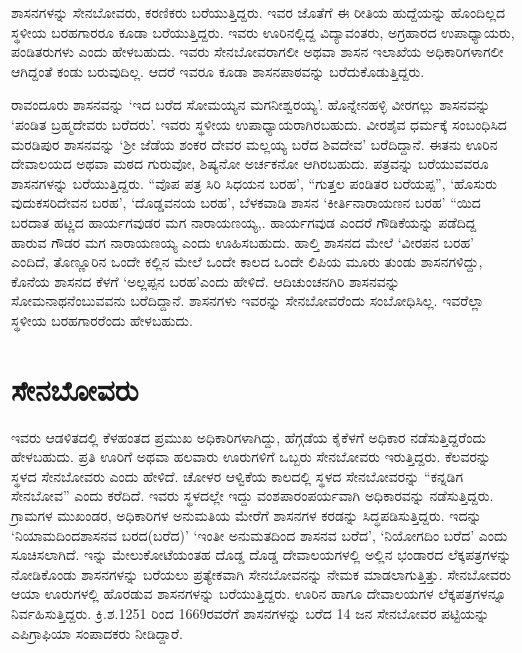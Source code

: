 ಶಾಸನಗಳನ್ನು ಸೇನಬೋವರು, ಕರಣಿಕರು ಬರೆಯುತ್ತಿದ್ದರು. ಇವರ ಜೊತೆಗೆ ಈ ರೀತಿಯ ಹುದ್ದೆಯನ್ನು ಹೊಂದಿಲ್ಲದ ಸ್ಥಳೀಯ ಬರಹಗಾರರೂ ಕೂಡಾ ಬರೆಯುತ್ತಿದ್ದರು. ಇವರು ಊರಿನಲ್ಲಿದ್ದ ವಿದ್ಯಾವಂತರು, ಅಗ್ರಹಾರದ ಉಪಾಧ್ಯಾಯರು, ಪಂಡಿತರುಗಳು ಎಂದು ಹೇಳಬಹುದು. ಇವರು ಸೇನಬೋವರಾಗಲೀ ಅಥವಾ ಶಾಸನ ಇಲಾಖೆಯ ಅಧಿಕಾರಿಗಳಾಗಲೀ ಆಗಿದ್ದಂತೆ ಕಂಡು ಬರುವುದಿಲ್ಲ. ಆದರೆ ಇವರೂ ಕೂಡಾ ಶಾಸನಪಾಠವನ್ನು ಬರೆದುಕೊಡುತ್ತಿದ್ದರು.

ರಾವಂದೂರು ಶಾಸನವನ್ನು ‘ಇದ ಬರೆದ ಸೋಮಯ್ಯನ ಮಗನೀಶ್ವರಯ್ಯ’. ಹೊನ್ನೇನಹಳ್ಳಿ ವೀರಗಲ್ಲು ಶಾಸನವನ್ನು ‘ಪಂಡಿತ ಬ್ರಹ್ಮದೇವರು ಬರೆದರು’. ಇವರು ಸ್ಥಳೀಯ ಉಪಾಧ್ಯಾಯರಾಗಿರಬಹುದು. ವೀರಶೈವ ಧರ್ಮಕ್ಕೆ ಸಂಬಂಧಿಸಿದ ಮರಡಿಪುರ ಶಾಸನವನ್ನು ‘ಶ‍್ರೀ ಜೆಡೆಯ ಶಂಕರ ದೇವರ ಮಲ್ಲಯ್ಯ ಬರೆದ ಶಿವದೇವ’ ಬರೆದಿದ್ದಾನೆ. ಈತನು ಊರಿನ ದೇವಾಲಯದ ಅಥವಾ ಮಠದ ಗುರುವೋ, ಶಿಷ್ಯನೋ ಅರ್ಚಕನೋ ಆಗಿರಬಹುದು. ಪತ್ರವನ್ನು ಬರೆಯುವವರೂ ಶಾಸನಗಳನ್ನು ಬರೆಯುತ್ತಿದ್ದರು. “ವೊಪ ಪತ್ರ ಸಿರಿ ಸಿಧಯನ ಬರಹ’, “ಗುತ್ತಲ ಪಂಡಿತರ ಬರೆಯಪ್ಪ”, ‘ಹೊಸುರು ವುದುಕಸರಿದೇವನ ಬರಹ’, ‘ದೊಡ್ಡವನಯ ಬರಹ’, ಬೆಳಕವಾಡಿ ಶಾಸನ ‘ಕೀರ್ತಿನಾರಾಯಣನ ಬರಹ’ “ಯಿದ ಬರದಾತ ಹಟ್ಣದ ಹಾರ್ಯಗವುಡರ ಮಗ ನಾರಾಯಣಯ್ಯ,. ಹಾರ್ಯಗವುಡ ಎಂದರೆ ಗೌಡಿಕೆಯನ್ನು ಪಡೆದಿದ್ದ ಹಾರುವ ಗೌಡರ ಮಗ ನಾರಾಯಣಯ್ಯ ಎಂದು ಊಹಿಸಬಹುದು. ಹಾಲ್ತಿ ಶಾಸನದ ಮೇಲೆ ‘ವೀರಪನ ಬರಹ’ ಎಂದಿದೆ, ತೊಣ್ಣೂರಿನ ಒಂದೇ ಕಲ್ಲಿನ ಮೇಲೆ ಒಂದೇ ಕಾಲದ ಒಂದೇ ಲಿಪಿಯ ಮೂರು ತುಂಡು ಶಾಸನಗಳಿದ್ದು, ಕೊನೆಯ ಶಾಸನದ ಕೆಳಗೆ ‘ಅಲ್ಲಪ್ಪನ ಬರಹ’ಎಂದು ಹೇಳಿದೆ. ಆದಿಚುಂಚನಗಿರಿ ಶಾಸನವನ್ನು ಸೋಮನಾಥನೆಂಬುವವನು ಬರೆದಿದ್ದಾನೆ. ಶಾಸನಗಳು ಇವರನ್ನು ಸೇನಬೋವರೆಂದು ಸಂಬೋಧಿಸಿಲ್ಲ. ಇವರೆಲ್ಲಾ ಸ್ಥಳೀಯ ಬರಹಗಾರರೆಂದು ಹೇಳಬಹುದು.


\section{ಸೇನಬೋವರು}

ಇವರು ಆಡಳಿತದಲ್ಲಿ ಕೆಳಹಂತದ ಪ್ರಮುಖ ಅಧಿಕಾರಿಗಳಾಗಿದ್ದು, ಹೆಗ್ಗಡೆಯ ಕೈಕೆಳಗೆ ಅಧಿಕಾರ ನಡೆಸುತ್ತಿದ್ದರೆಂದು ಹೇಳಬಹುದು. ಪ್ರತಿ ಊರಿಗೆ ಅಥವಾ ಹಲವಾರು ಊರುಗಳಿಗೆ ಒಬ್ಬರು ಸೇನಬೋವರು ಇರುತ್ತಿದ್ದರು. ಕೆಲವರನ್ನು ಸ್ಥಳದ ಸೇನಬೋವರು ಎಂದು ಹೇಳಿದೆ. ಚೋಳರ ಆಳ್ವಿಕೆಯ ಕಾಲದಲ್ಲಿ ಸ್ಥಳದ ಸೇನಬೋವರನ್ನು “ಕನ್ನಡಿಗ ಸೇನಬೋವ” ಎಂದು ಕರೆದಿದೆ. ಇವರು ಸ್ಥಳದಲ್ಲೇ ಇದ್ದು ವಂಶಪಾರಂಪರ್ಯವಾಗಿ ಅಧಿಕಾರವನ್ನು ನಡೆಸುತ್ತಿದ್ದರು. ಗ್ರಾಮಗಳ ಮುಖಂಡರ, ಅಧಿಕಾರಿಗಳ ಅನುಮತಿಯ ಮೇರೆಗೆ ಶಾಸನಗಳ ಕರಡನ್ನು ಸಿದ್ಧಪಡಿಸುತ್ತಿದ್ದರು. ಇದನ್ನು ‘ನಿಯಾಮದಿಂದಶಾಸನವ ಬರದ(ಬರೆದ)’ ‘ಇಂತೀ ಅನುಮತದಿಂದ ಶಾಸನವ ಬರೆದ’, ‘ನಿಯೋಗದಿಂ ಬರೆದ’ ಎಂದು ಸೂಚಿಸಲಾಗಿದೆ. ಇನ್ನು ಮೇಲುಕೋಟೆಯಂತಹ ದೊಡ್ಡ ದೊಡ್ಡ ದೇವಾಲಯಗಳಲ್ಲಿ ಅಲ್ಲಿನ ಭಂಡಾರದ ಲೆಕ್ಕಪತ್ರಗಳನ್ನು ನೋಡಿಕೊಂಡು ಶಾಸನಗಳನ್ನು ಬರೆಯಲು ಪ್ರತ್ಯೇಕವಾಗಿ ಸೇನಬೋವನನ್ನು ನೇಮಕ ಮಾಡಲಾಗುತ್ತಿತ್ತು. ಸೇನಬೋವರು ಆಯಾ ಊರುಗಳಲ್ಲಿ ಹೊರಡುವ ಶಾಸನಗಳನ್ನು ಬರೆಯು\-ತ್ತಿದ್ದರು. ಊರಿನ ಹಾಗೂ ದೇವಾಲಯಗಳ ಲೆಕ್ಕಪತ್ರಗಳನ್ನೂ ನಿರ್ವಹಿಸುತ್ತಿದ್ದರು. ಕ್ರಿ.ಶ.1251 ರಿಂದ 1669ರವರೆಗೆ ಶಾಸನಗಳನ್ನು ಬರೆದ 14 ಜನ ಸೇನಬೋವರ ಪಟ್ಟಿಯನ್ನು ಎಪಿಗ್ರಾಫಿಯಾ ಸಂಪಾದಕರು ನೀಡಿದ್ದಾರೆ.

